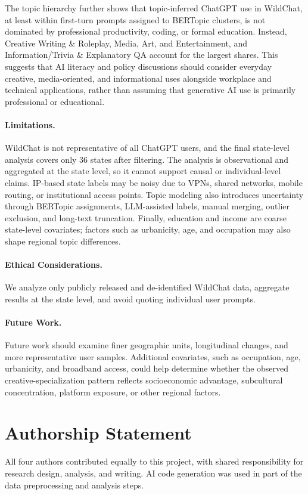 \documentclass[11pt]{article}
\begin{document}
The topic hierarchy further shows that topic-inferred ChatGPT use in WildChat, at least within first-turn prompts assigned to BERTopic clusters, is not dominated by professional productivity, coding, or formal education. Instead, Creative Writing \& Roleplay, Media, Art, and Entertainment, and Information/Trivia \& Explanatory QA account for the largest shares. This suggests that AI literacy and policy discussions should consider everyday creative, media-oriented, and informational uses alongside workplace and technical applications, rather than assuming that generative AI use is primarily professional or educational.

\paragraph{Limitations.}
WildChat is not representative of all ChatGPT users, and the final state-level analysis covers only 36 states after filtering. The analysis is observational and aggregated at the state level, so it cannot support causal or individual-level claims. IP-based state labels may be noisy due to VPNs, shared networks, mobile routing, or institutional access points. Topic modeling also introduces uncertainty through BERTopic assignments, LLM-assisted labels, manual merging, outlier exclusion, and long-text truncation. Finally, education and income are coarse state-level covariates; factors such as urbanicity, age, and occupation may also shape regional topic differences.

\paragraph{Ethical Considerations.}
We analyze only publicly released and de-identified WildChat data, aggregate results at the state level, and avoid quoting individual user prompts.

\paragraph{Future Work.}
Future work should examine finer geographic units, longitudinal changes, and more representative user samples. Additional covariates, such as occupation, age, urbanicity, and broadband access, could help determine whether the observed creative-specialization pattern reflects socioeconomic advantage, subcultural concentration, platform exposure, or other regional factors.



\section*{Authorship Statement}
All four authors contributed equally to this project, with shared responsibility for research design, analysis, and writing.
AI code generation was used in part of the data preprocessing and analysis steps. 
\nocite{zhao2024wildchat,eisenstein2010latent,grootendorst2022bertopic,bianchi2021pretraining,daepp2024emerging,blei2003lda,zheng2024lmsys,appel2025anthropic}

\end{document}
